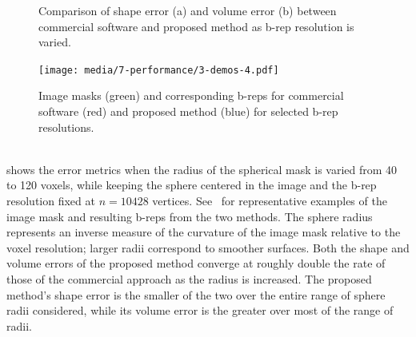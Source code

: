 \begin{figure}[h!]
\centering
{}
%	
\caption{Comparison of shape error (a) and volume error (b) between commercial software and proposed method as b-rep resolution is varied.}
\label{fig:graph1}
\end{figure}
\begin{figure}[ht!]
	\centering
	\texttt{[image: media/7-performance/3-demos-4.pdf]}
	\caption{Image masks (green) and corresponding b-reps for commercial software (red) and proposed method (blue) for selected b-rep resolutions.}
	\label{fig:demos1}
\end{figure} \\
%
 shows the error metrics when the radius of the spherical mask is varied from 40 to 120 voxels, while keeping the sphere centered in the image and the b-rep resolution fixed at $n = 10428$ vertices. See~ for representative examples of the image mask and resulting b-reps from the two methods. The sphere radius represents an inverse measure of the curvature of the image mask relative to the voxel resolution; larger radii correspond to smoother surfaces. Both the shape and volume errors of the proposed method converge at roughly double the rate of those of the commercial approach as the radius is increased. The proposed method's shape error is the smaller of the two over the entire range of sphere radii considered, while its volume error is the greater over most of the range of radii.

